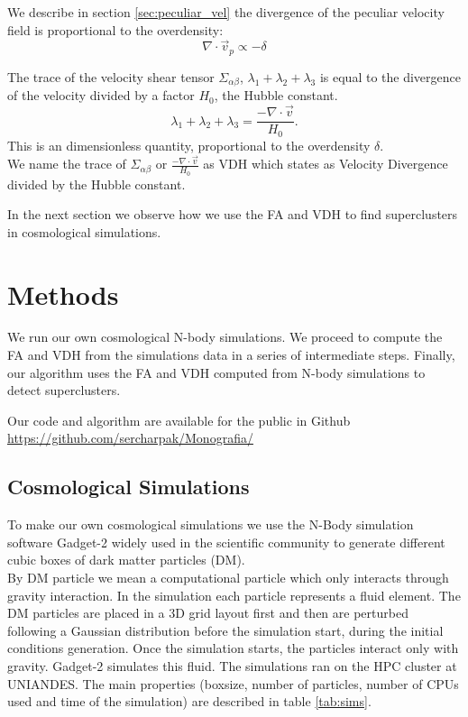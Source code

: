 \documentclass[12pt]{article}
\begin{document}
We describe in section \ref{sec:peculiar_vel} the divergence of the peculiar velocity field is proportional to the overdensity:
\[
\nabla \cdot \vec{v}_p \propto - \delta
\]

The trace of the velocity shear tensor $\Sigma
 _{\alpha\beta}$, $\lambda_1 + \lambda_2 + \lambda_3$ is
 equal to the divergence of the velocity divided by a
  factor $H_0$, the Hubble constant.
\[
\lambda_1 + \lambda_2 + \lambda_3 = \frac{- \nabla \cdot \vec{v}}{H_0} .
\]
This is an dimensionless quantity, proportional to the overdensity $\delta$.\\

We name the trace of $\Sigma_{\alpha\beta}$ or $\frac{- \nabla \cdot \vec{v}}{H_0}$ as VDH which states as
 Velocity Divergence divided by the Hubble constant. 

In the next section we observe how we use the FA and VDH
 to find superclusters in cosmological simulations.

\section{Methods}

\begin{par}
We run our own cosmological N-body simulations. We
 proceed to compute the FA and VDH from the simulations
  data in a series of intermediate steps. Finally, our
   algorithm uses the FA and VDH computed from N-body
    simulations to detect superclusters.
\end{par}

\begin{par}
Our code and algorithm are available for the
  public in Github
   \url{https://github.com/sercharpak/Monografia/}
\end{par}


\subsection{Cosmological Simulations}\label{sec:sims}
\begin{par}
To make our own cosmological simulations we use the N-Body simulation software Gadget-2
 \cite{springel_gadget_2_2005}
widely used in the scientific community to
 generate different cubic boxes of dark matter
  particles
  (DM). \\

By DM particle we mean a computational particle which only interacts through gravity
interaction. In the simulation each particle
 represents a fluid element. The DM particles are
placed in a 3D grid layout first and then are
 perturbed following a Gaussian distribution
before the simulation start, during the initial
 conditions generation. Once the simulation starts, the particles interact only with gravity. Gadget-2 simulates this fluid. The simulations ran on the HPC cluster at
   UNIANDES.
  The main properties (boxsize, number of
   particles, number of CPUs used and time of the
    simulation) are described in table
     \ref{tab:sims}. \\
\end{par}
\end{document}
